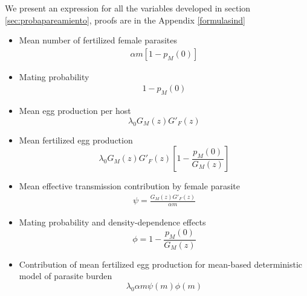 \documentclass[12pt,a4paper]{article}
\theoremstyle{plain}%
\theoremstyle{definition}
\theoremstyle{remark}
\begin{document}
	We present an expression for all the variables developed in section
	\ref{sec:probapareamiento}, proofs  are  in the Appendix \ref{formulasind}
	\begin{itemize}
		\item Mean number of fertilized female parasites
		\begin{align}
		\alpha m \left[1-p_M(0) \right] 
		\end{align}
		
		\item Mating probability 
		\begin{align}
		1-p_M(0) 
		\end{align}
		
		\item Mean egg production per host
		\begin{equation}
		\lambda_0G_M(z)G'_F(z)
		\end{equation}
		
		\item Mean fertilized egg production
		\begin{equation}
		\lambda_0 G_M(z) G'_F(z)\left[ 1-\frac{p_M(0)}{G_M(z)}\right]
		\end{equation}
		
		\item Mean effective transmission contribution by female parasite
		\begin{align}
		\psi=\frac{G_M(z)G'_F(z)}{\alpha m}
		\end{align}
		
		\item Mating probability and density-dependence effects
		\begin{equation}
		\phi= 1-\frac{p_M(0)}{G_M(z)}
		\end{equation}
		
		\item Contribution of mean fertilized egg production for mean-based deterministic model  of parasite burden
		 \begin{equation}
		\lambda_0 \alpha m \psi(m) \phi(m)
		\end{equation}
	\end{itemize}
	
\end{document}
